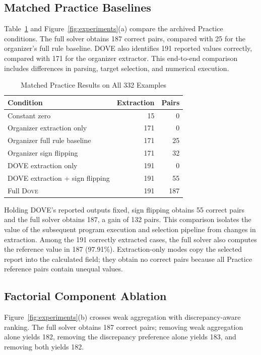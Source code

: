 \documentclass[conference]{IEEEtran}
\newcommand{\dove}{\textsc{Dove}}
\begin{document}
\subsection{Matched Practice Baselines}
\label{sec:practice-baselines}

Table~\ref{tab:baselines} and Figure~\ref{fig:experiments}(a) compare the archived Practice conditions. The full solver obtains 187 correct pairs, compared with 25 for the organizer's full rule baseline. DOVE also identifies 191 reported values correctly, compared with 171 for the organizer extractor. This end-to-end comparison includes differences in parsing, target selection, and numerical execution.

\begin{table}[t]
\caption{Matched Practice Results on All 332 Examples}
\label{tab:baselines}
\centering
\footnotesize
\setlength{\tabcolsep}{4pt}
\begin{tabular}{lrr}
\toprule
Condition & Extraction & Pairs \\
\midrule
Constant zero & 15 & 0 \\
Organizer extraction only & 171 & 0 \\
Organizer full rule baseline & 171 & 25 \\
Organizer sign flipping & 171 & 32 \\
DOVE extraction only & 191 & 0 \\
DOVE extraction + sign flipping & 191 & 55 \\
Full \dove{} & 191 & 187 \\
\bottomrule
\end{tabular}
\end{table}

Holding DOVE's reported outputs fixed, sign flipping obtains 55 correct pairs and the full solver obtains 187, a gain of 132 pairs. This comparison isolates the value of the subsequent program execution and selection pipeline from changes in extraction. Among the 191 correctly extracted cases, the full solver also computes the reference value in 187 (97.91\%). Extraction-only modes copy the selected report into the calculated field; they obtain no correct pairs because all Practice reference pairs contain unequal values.

\subsection{Factorial Component Ablation}
\label{sec:ablation}

Figure~\ref{fig:experiments}(b) crosses weak aggregation with discrepancy-aware ranking. The full solver obtains 187 correct pairs; removing weak aggregation alone yields 182, removing the discrepancy preference alone yields 183, and removing both yields 182.
\end{document}
